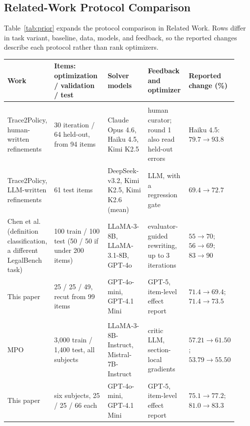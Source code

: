 \documentclass[11pt]{article}
\begin{document}
\subsection{Related-Work Protocol Comparison}
\label{app:prior}
Table~\ref{tab:prior} expands the protocol comparison in Related Work. Rows differ in task variant, baseline, data,
models, and feedback, so the reported changes describe each protocol rather than rank optimizers.

\begin{table}[!tp]
\centering
\footnotesize
\setlength{\tabcolsep}{3pt}
\begin{tabular}{@{}p{0.18\linewidth}p{0.24\linewidth}p{0.18\linewidth}p{0.18\linewidth}p{0.15\linewidth}@{}}
\toprule
\rowcolor{midblue}Work & Items: optimization / validation / test & Solver models & Feedback and optimizer & Reported change (\%) \\
\midrule
\rowcolor{midgreen}\multicolumn{5}{l}{\textbf{LegalBench-Hearsay}} \\
Trace2Policy, human-written refinements~\citep{zha2026trace2policy} & 30 iteration / 64 held-out, from 94 items & Claude Opus 4.6, Haiku 4.5, Kimi K2.5 & human curator; round 1 also read held-out errors & Haiku 4.5: $79.7\rightarrow 93.8$ \\
Trace2Policy, LLM-written refinements~\citep{zha2026trace2policy} & 61 test items & DeepSeek-v3.2, Kimi K2.5, Kimi K2.6 (mean) & LLM, with a regression gate & $69.4\rightarrow 72.7$ \\
Chen et al.~\citeyearpar{chen2025knowing} (definition classification, a different LegalBench task) & 100 train / 100 test (50 / 50 if under 200 items) & LLaMA-3-8B, LLaMA-3.1-8B, GPT-4o & evaluator-guided rewriting, up to 3 iterations & $55\rightarrow 70$; $56\rightarrow 69$; $83\rightarrow 90$ \\
\rowcolor{softblue}This paper & 25 / 25 / 49, recut from 99 items & GPT-4o-mini, GPT-4.1 Mini & GPT-5, item-level effect report & $71.4\rightarrow 69.4$; $71.4\rightarrow 73.5$ \\
\midrule
\rowcolor{midgreen}\multicolumn{5}{l}{\textbf{MMLU}} \\
MPO~\citep{sharma2026mpo} & 3,000 train / 1,400 test, all subjects & LLaMA-3-8B-Instruct, Mistral-7B-Instruct & critic LLM, section-local gradients & $57.21\rightarrow 61.50$; $53.79\rightarrow 55.50$ \\
\rowcolor{softblue}This paper & six subjects, 25 / 25 / 66 each & GPT-4o-mini, GPT-4.1 Mini & GPT-5, item-level effect report & $75.1\rightarrow 77.2$; $81.0\rightarrow 83.3$ \\

\end{tabular}
\end{table}
\end{document}
